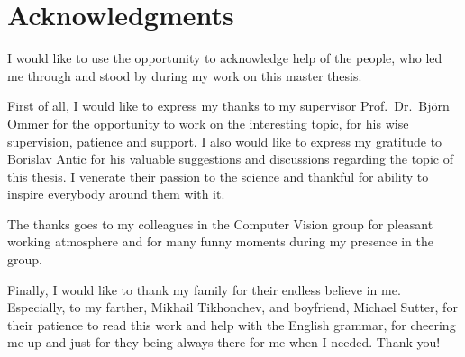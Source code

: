 
\chapter*{Acknowledgments}

I would like to use the opportunity to acknowledge help of the people, who led me through and stood by during my work on this master thesis.

First of all, I would like to express my thanks to my supervisor Prof.~Dr.~Bj\"{o}rn Ommer for the opportunity to work on the interesting topic, for his wise supervision, patience and support. I also would like to express my gratitude to Borislav Antic for his valuable suggestions and discussions regarding the topic of this thesis. I venerate their passion to the science and thankful for ability to inspire everybody around them with it.

The thanks goes to my colleagues in the Computer Vision group for pleasant working atmosphere and for many funny moments during my presence in the group.

Finally, I would like to thank my family for their endless believe in me. Especially, to my farther, Mikhail Tikhonchev, and boyfriend, Michael Sutter, for their patience to read this work and help with the English grammar, for cheering me up and just for they being always there for me when I needed. Thank you!